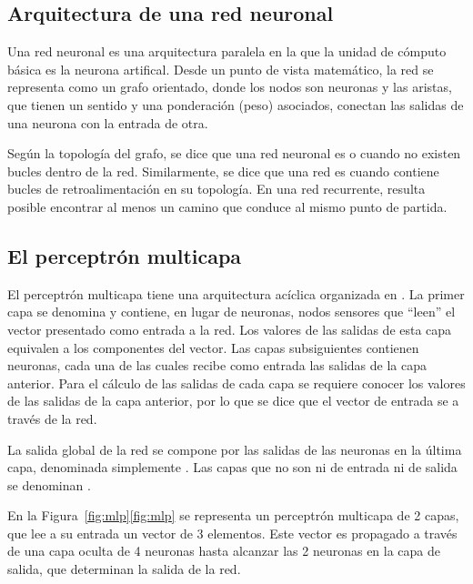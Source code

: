 %
%
\subsection{Arquitectura de una red neuronal}
%
Una red neuronal es
una arquitectura paralela en la que la unidad de cómputo
básica es la neurona artifical.
Desde un punto de vista matemático,
la red se representa como un grafo orientado, donde los nodos son
neuronas y las aristas, que tienen un sentido y una ponderación (peso)
asociados, conectan las salidas de una neurona con la entrada de otra.

Según la topología del grafo, se dice que una red neuronal es
 o  cuando no existen
bucles dentro de la red. Similarmente, se dice que una red es
 cuando contiene bucles de {retroalimentación} en su
topología.
En una red recurrente, resulta posible encontrar al menos
un camino que conduce al mismo punto de partida.
%
%
\subsection{El perceptrón multicapa}
%
El perceptrón multicapa tiene una arquitectura acíclica organizada en
. La primer capa se denomina  y contiene,
en lugar de neuronas, nodos sensores que ``leen'' el vector presentado
como entrada a la red. Los valores de las salidas de esta capa equivalen
a los componentes del vector. Las capas subsiguientes contienen
neuronas, cada una de las cuales recibe como entrada  las
salidas de la capa anterior.  Para el cálculo de las salidas de cada
capa se requiere conocer los valores de las salidas de la capa anterior,
por lo que se dice que el vector de entrada se  a través de la red.


La salida global de la red se compone por las salidas de las neuronas en la
última capa, denominada simplemente . Las capas que no son ni de
entrada ni de salida se denominan .

En la \iflatexml{}Figura~\ref{fig:mlp}\else\autoref{fig:mlp}\fi{} se
representa un perceptrón multicapa de 2 capas, que lee a su entrada un vector de 3
elementos. Este vector es propagado a través de una capa oculta de 4
neuronas hasta alcanzar las 2 neuronas en la capa de
salida, que determinan la salida de la red.
